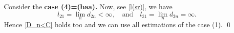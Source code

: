 \documentclass[10pt,a4paper]{amsart}
\begin{document}
\begin{pf}
Consider the {\bf case (4)=(baa).
}
Now, see \eqref{l(sr)}, we have 
\begin{equation*}
 l_{21}\!=\!\lim_nd_{2n}<\infty,\quad\text{and}  \quad
l_{31}\!=\!\lim_nd_{3n}=\infty. 
\end{equation*}
Hence \eqref{D_n<C}  holds too and we can use
all estimations of the case (1).
%
\qed\end{pf}
\end{document}
